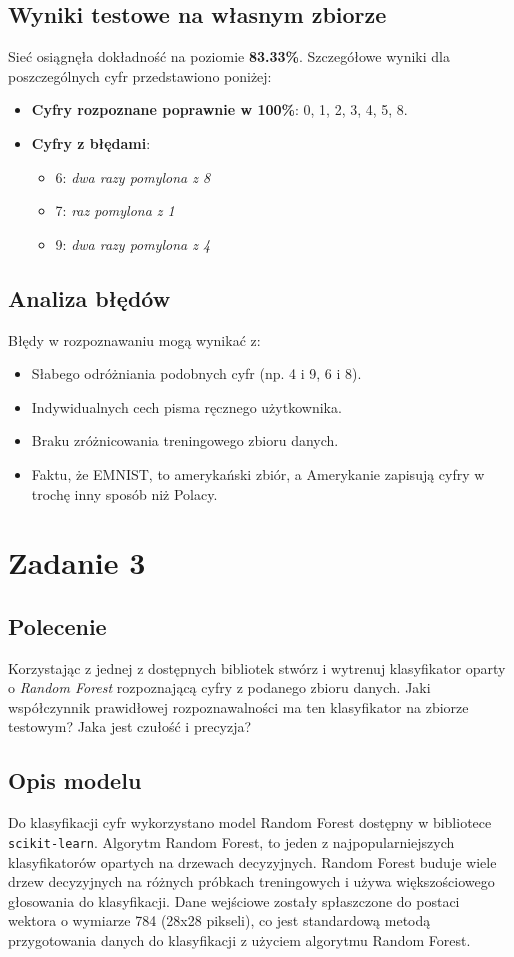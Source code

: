 \documentclass{article}
\begin{document}
\subsection{Wyniki testowe na własnym zbiorze}
Sieć osiągnęła dokładność na poziomie \textbf{83.33\%}. Szczegółowe wyniki dla poszczególnych cyfr przedstawiono poniżej:
\begin{itemize}
    \item \textbf{Cyfry rozpoznane poprawnie w 100\%}: 0, 1, 2, 3, 4, 5, 8.
    \item \textbf{Cyfry z błędami}:
    \begin{itemize}
        \item 6: \textit{dwa razy pomylona z 8}
        \item 7: \textit{raz pomylona z 1}
        \item 9: \textit{dwa razy pomylona z 4}
    \end{itemize}
\end{itemize}

\subsection{Analiza błędów}
Błędy w rozpoznawaniu mogą wynikać z:
\begin{itemize}
    \item Słabego odróżniania podobnych cyfr (np. 4 i 9, 6 i 8).
    \item Indywidualnych cech pisma ręcznego użytkownika.
    \item Braku zróżnicowania treningowego zbioru danych.
    \item Faktu, że EMNIST, to amerykański zbiór, a Amerykanie zapisują cyfry w trochę inny sposób niż Polacy.
\end{itemize}

\section{Zadanie 3}
\subsection{Polecenie}
Korzystając z jednej z dostępnych bibliotek stwórz i wytrenuj klasyfikator oparty o \textit{Random Forest}
rozpoznającą cyfry z podanego zbioru danych. Jaki współczynnik prawidłowej
rozpoznawalności ma ten klasyfikator na zbiorze testowym? Jaka jest czułość i precyzja?

\subsection{Opis modelu}
Do klasyfikacji cyfr wykorzystano model Random Forest dostępny w bibliotece \texttt{scikit-learn}.
Algorytm Random Forest, to jeden z najpopularniejszych klasyfikatorów opartych na drzewach decyzyjnych. Random Forest buduje wiele drzew decyzyjnych na różnych próbkach treningowych i używa większościowego głosowania do klasyfikacji. Dane wejściowe zostały spłaszczone do postaci wektora o wymiarze 784 (28x28 pikseli), co jest standardową metodą przygotowania danych do klasyfikacji z użyciem algorytmu Random Forest.
\end{document}
